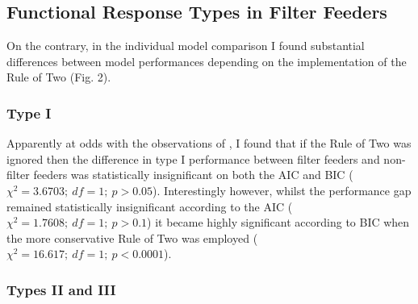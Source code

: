 \documentclass[11pt]{article}
\begin{document}
    
    \subsection{Functional Response Types in Filter Feeders}
    
    On the contrary, in the individual model comparison I found substantial differences between model performances depending on the implementation of the Rule of Two (Fig. 2).
    
    \subsubsection{Type I}
    
    Apparently at odds with the observations of \citet{jeschke2004consumer}, I found that if the Rule of Two was ignored then the difference in type I performance between filter feeders and non-filter feeders was statistically insignificant on both the AIC and BIC ($\chi^2=3.6703;\:df=1;\:p>0.05$). Interestingly however, whilst the performance gap remained statistically insignificant according to the AIC ($\chi^2=1.7608;\:df=1;\:p>0.1$) it became highly significant according to BIC when the more conservative Rule of Two was employed ($\chi^2=16.617;\:df=1;\:p<0.0001$).
    
    \subsubsection{Types II and III}
    
\end{document}
